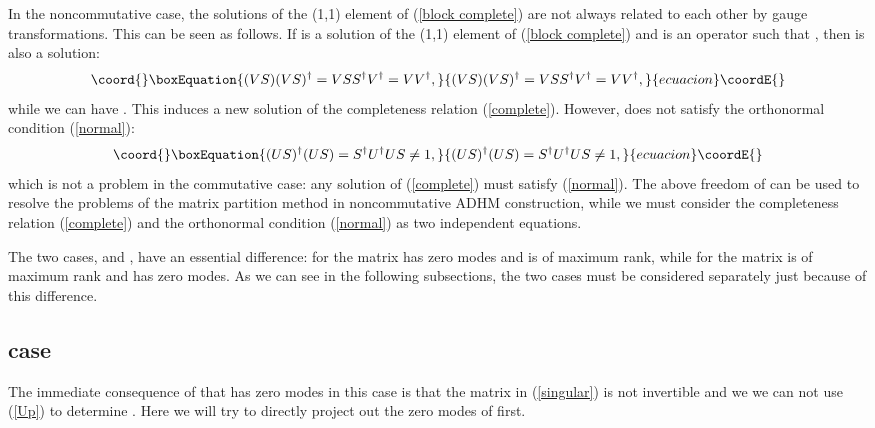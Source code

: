 \documentclass[a4paper,a4paper]{article}
\begin{document}
In the noncommutative case, the solutions of the (1,1) element of
(\ref{block complete}) are not always related to each other by
gauge transformations. This can be seen as follows.  If \coordHE{} is a
solution of the (1,1) element of (\ref{block complete}) and \coordHE{} is
an operator such that \coordHE{}, then \coordHE{} is also a solution:
\begin{equation}\coord{}\boxEquation{
(VS)(VS)^\dag=VSS^\dag V^\dag=VV^\dag,
}{
(VS)(VS)^\dag=VSS^\dag V^\dag=VV^\dag,
}{ecuacion}\coordE{}\end{equation}
while we can have \coordHE{}. This \coordHE{} induces a new solution
\coordHE{} of the completeness relation (\ref{complete}). However, \coordHE{}
does not satisfy the orthonormal condition (\ref{normal}):
\begin{equation}\coord{}\boxEquation{
(US)^\dag(US)=S^\dag U^\dag US\ne 1,
}{
(US)^\dag(US)=S^\dag U^\dag US\ne 1,
}{ecuacion}\coordE{}\end{equation}
which is not a problem in the commutative case: any solution of
(\ref{complete}) must satisfy (\ref{normal}). The above freedom of
\coordHE{} can be used to resolve the problems of the matrix partition
method in noncommutative ADHM construction, while we must consider
the completeness relation (\ref{complete}) and the orthonormal
condition (\ref{normal}) as two independent equations.

The two cases, \coordHE{} and \coordHE{}, have an essential
difference: for \coordHE{} the matrix \coordHE{} has zero modes
and \coordHE{} is of maximum rank, while for \coordHE{} the
matrix \coordHE{} is of maximum rank and \coordHE{} has zero
modes. As we can see in the following subsections, the two cases
must be considered separately just because of this difference.

\subsection{\coordHE{} case}
The immediate consequence of that \coordHE{} has zero modes in this
case is that the matrix \coordHE{} in (\ref{singular}) is not invertible
and we we can not use (\ref{Up}) to determine \coordHE{}. Here we will
try to directly project out the zero modes of \coordHE{} first.
\end{document}
